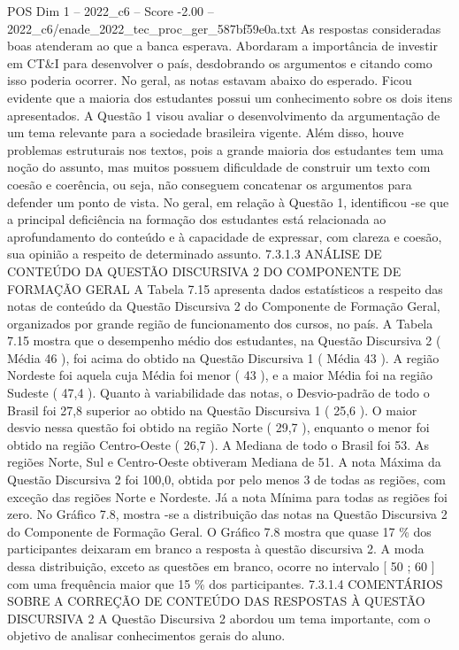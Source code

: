 \begin{textsample}{POS Dim 1 – 2022\_c6 – Score -2.00 – 2022\_c6/enade\_2022\_tec\_proc\_ger\_587bf59e0a.txt}
As respostas consideradas boas atenderam ao que a banca esperava.
Abordaram a importância de investir em CT\&I para desenvolver o país, desdobrando os argumentos e citando como isso poderia ocorrer.
No geral, as notas estavam abaixo do esperado.
Ficou evidente que a maioria dos estudantes possui um conhecimento sobre os dois itens apresentados.
A Questão 1 visou avaliar o desenvolvimento da argumentação de um tema relevante para a sociedade brasileira vigente.
Além disso, houve problemas estruturais nos textos, pois a grande maioria dos estudantes tem uma noção do assunto, mas muitos possuem dificuldade de construir um texto com coesão e coerência, ou seja, não conseguem concatenar os argumentos para defender um ponto de vista.
No geral, em relação à Questão 1, identificou -se que a principal deficiência na formação dos estudantes está relacionada ao aprofundamento do conteúdo e à capacidade de expressar, com clareza e coesão, sua opinião a respeito de determinado assunto. 7.3.1.3 ANÁLISE DE CONTEÚDO DA QUESTÃO DISCURSIVA 2 DO COMPONENTE DE FORMAÇÃO GERAL A Tabela 7.15 apresenta dados estatísticos a respeito das notas de conteúdo da Questão Discursiva 2 do Componente de Formação Geral, organizados por grande região de funcionamento dos cursos, no país.
A Tabela 7.15 mostra que o desempenho médio dos estudantes, na Questão Discursiva 2 ( Média 46 ), foi acima do obtido na Questão Discursiva 1 ( Média 43 ).
A região Nordeste foi aquela cuja Média foi menor ( 43 ), e a maior Média foi na região Sudeste ( 47,4 ).
Quanto à variabilidade das notas, o Desvio-padrão de todo o Brasil foi 27,8 superior ao obtido na Questão Discursiva 1 ( 25,6 ).
O maior desvio nessa questão foi obtido na região Norte ( 29,7 ), enquanto o menor foi obtido na região Centro-Oeste ( 26,7 ).
A Mediana de todo o Brasil foi 53.
As regiões Norte, Sul e Centro-Oeste obtiveram Mediana de 51.
A nota Máxima da Questão Discursiva 2 foi 100,0, obtida por pelo menos 3 de todas as regiões, com exceção das regiões Norte e Nordeste.
Já a nota Mínima para todas as regiões foi zero.
No Gráfico 7.8, mostra -se a distribuição das notas na Questão Discursiva 2 do Componente de Formação Geral.
O Gráfico 7.8 mostra que quase 17 \% dos participantes deixaram em branco a resposta à questão discursiva 2.
A moda dessa distribuição, exceto as questões em branco, ocorre no intervalo [ 50 ; 60 ] com uma frequência maior que 15 \% dos participantes. 7.3.1.4 COMENTÁRIOS SOBRE A CORREÇÃO DE CONTEÚDO DAS RESPOSTAS À QUESTÃO DISCURSIVA 2 A Questão Discursiva 2 abordou um tema importante, com o objetivo de analisar conhecimentos gerais do aluno.

\end{textsample}
